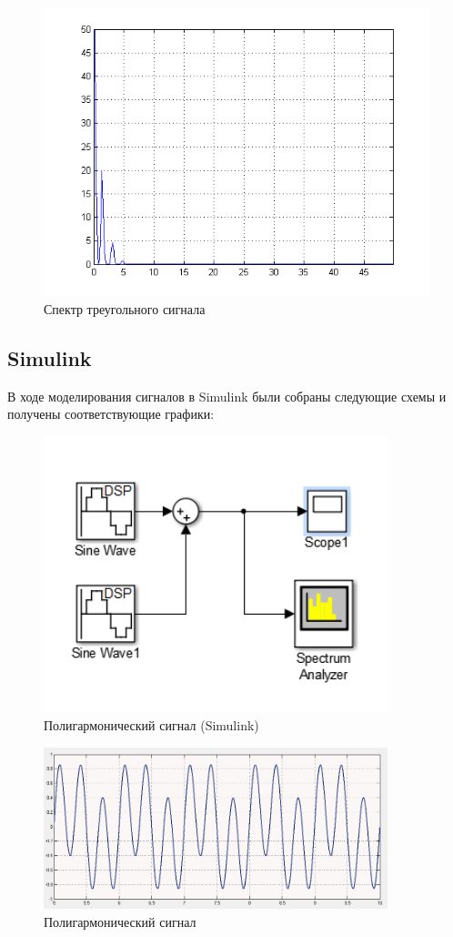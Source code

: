 \begin{figure}[H]
   \includegraphics[scale=0.7]{lab5/triangle_spectro.png}
   \caption{Спектр треугольного сигнала}
\end{figure}

\subsection{Simulink}

В ходе моделирования сигналов в Simulink были собраны следующие схемы и получены соответствующие графики:

\begin{figure}[H]
\centering
\includegraphics[width=10cm]{lab5/1_simulink} 
\caption{Полигармонический сигнал (Simulink)} 
\end{figure}

\begin{figure}[H]
\centering
\includegraphics[width=10cm]{lab5/lab5_1_simulink} 
\caption{Полигармонический сигнал} 
\end{figure}

